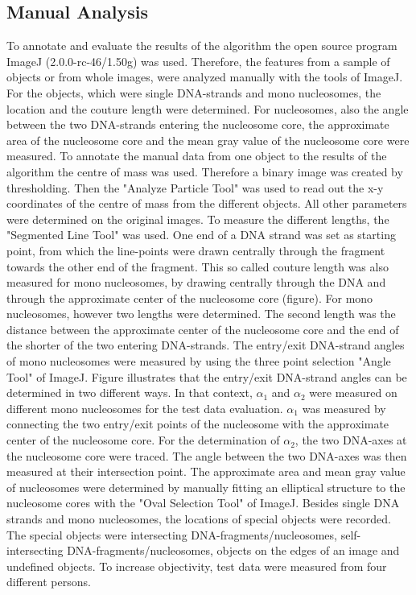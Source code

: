\documentclass{article}
\begin{document}
\subsection{Manual Analysis}\label{sec:Manual Analysis}
To annotate and evaluate the results of the algorithm the open source program ImageJ (2.0.0-rc-46/1.50g) was used. Therefore, the features from a sample of objects or from whole images, were analyzed manually with the tools of ImageJ.
For the objects, which were single DNA-strands and mono nucleosomes, the location and the couture length were determined. For nucleosomes, also the angle between the two DNA-strands entering the nucleosome core, the approximate area of the nucleosome core and the mean gray value of the nucleosome core were measured.
To annotate the manual data from one object to the results of the algorithm the centre of mass was used. Therefore a binary image was created by thresholding. Then the "Analyze Particle Tool" was used to read out the x-y coordinates of the centre of mass from the different objects. 
All other parameters were determined on the original images. To measure the different lengths, the "Segmented Line Tool" was used. One end of a DNA strand was set as starting point, from which the line-points were drawn centrally through the fragment towards the other end of the fragment. This so called couture length was also measured for mono nucleosomes, by drawing centrally through the DNA and through the approximate center of the nucleosome core (figure). For mono nucleosomes, however two lengths were determined. The second length was the distance between the approximate center of the nucleosome core and the end of the shorter of the two entering DNA-strands.
The entry/exit DNA-strand angles of mono nucleosomes were measured by using the three point selection "Angle Tool" of ImageJ. Figure illustrates that the entry/exit DNA-strand angles can be determined in two different ways. In that context, $\alpha_1$ and $\alpha_2$ were measured on different mono nucleosomes for the test data evaluation.
$\alpha_1$ was measured by connecting the two entry/exit points of the nucleosome with the approximate center of the nucleosome core. For the determination of $\alpha_2$, the two DNA-axes at the nucleosome core were traced. The angle between the two DNA-axes was then measured at their intersection point.
The approximate area and mean gray value of nucleosomes were determined by manually fitting an elliptical structure to the nucleosome cores with the "Oval Selection Tool" of ImageJ.
Besides single DNA strands and mono nucleosomes, the locations of special objects were recorded. The special objects were intersecting DNA-fragments/nucleosomes, self-intersecting DNA-fragments/nucleosomes, objects on the edges of an image and undefined objects. To increase objectivity, test data were measured from four different persons.
\end{document}
